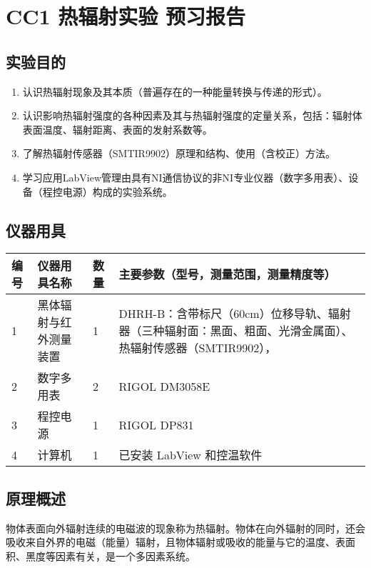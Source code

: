 \documentclass[dvipsnames, svgnames,a4paper,11pt]{article}
\begin{document}
\setcounter{section}{0}
\section{CC1 \quad 热辐射实验 \quad\heiti 预习报告}
	
\subsection{实验目的}
	\begin{enumerate}
		\item 认识热辐射现象及其本质（普遍存在的一种能量转换与传递的形式）。
		\item 认识影响热辐射强度的各种因素及其与热辐射强度的定量关系，包括：辐射体表面温度、辐射距离、表面的发射系数等。
		\item 了解热辐射传感器（SMTIR9902）原理和结构、使用（含校正）方法。
		\item 学习应用LabView管理由具有NI通信协议的非NI专业仪器（数字多用表）、设备（程控电源）构成的实验系统。
		
		
	\end{enumerate}

\subsection{仪器用具}
\begin{table}[htbp]
	\centering
	\renewcommand\arraystretch{1.6}
	\begin{tabular}{p{}|p{}|p{}|p{}}
	\hline
	编号& 仪器用具名称 & 数量 &  主要参数（型号，测量范围，测量精度等） \\
	\hline
	1&黑体辐射与红外测量装置 	&1 	& DHRH-B：含带标尺（60cm）位移导轨、辐射器（三种辐射面：黑面、粗面、光滑金属面）、热辐射传感器（SMTIR9902），\\

	2&数字多用表 	& 2	& RIGOL DM3058E \\
	
	3&程控电源 	& 1 & RIGOL DP831\\
	
	4&计算机 &1 &已安装 LabView 和控温软件 \\
	
	
	
	\hline
\end{tabular}
\end{table}

\subsection{原理概述}
	物体表面向外辐射连续的电磁波的现象称为热辐射。物体在向外辐射的同时，还会吸收来自外界的电磁（能量）辐射，且物体辐射或吸收的能量与它的温度、表面积、黑度等因素有关，是一个多因素系统。
\end{document}
